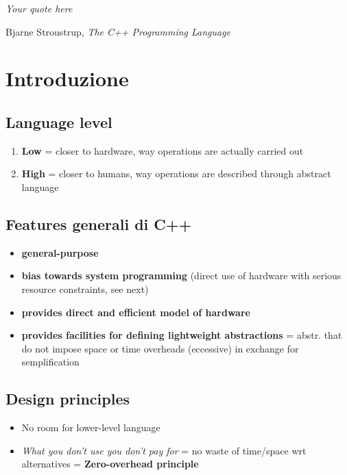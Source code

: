 \documentclass[10pt, oneside]{book}
\begin{document}
\tableofcontents
\newpage

\hspace{0cm}
\vfill
\epigraph{\textit{Your quote here}}{Bjarne Stroustrup, \textit{The C++ Programming Language}}
\vfill
\hspace{0cm}

\newpage

\chapter{Introduzione}

\section{Language level}
\begin{enumerate}
\item \textbf{Low} = closer to hardware, way operations are actually carried out
\item \textbf{High} = closer to humans, way operations are described through abstract language
\end{enumerate}

\section{Features generali di C++}
\begin{itemize}
\item \textbf{general-purpose} 
\item \textbf{bias towards system programming} (direct use of hardware with serious resource constraints, see next)
\item \textbf{provides direct and efficient model of hardware}
\item \textbf{provides facilities for defining lightweight abstractions} = abstr. that do not impose space or time overheads (eccessive) in exchange for semplification
\end{itemize}
\section{Design principles}
\begin{itemize}
\item No room for lower-level language
\item \textit{What you don't use you don't pay for} = no waste of time/space wrt alternatives = \textbf{Zero-overhead principle}
\end{itemize}
\end{document}
